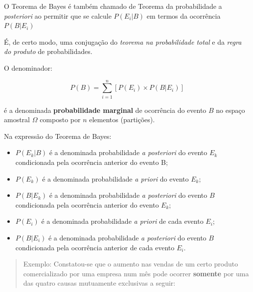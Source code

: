 \documentclass[
]{book}
\providecommand{\tightlist}{%
  \setlength{\itemsep}{0pt}\setlength{\parskip}{0pt}}
\begin{document}
\hfill\break

O Teorema de Bayes é também chamado de Teorema da probabilidade a \emph{posteriori} ao permitir que se calcule \(P(E_{i}|B)\) em termos da ocorrência \(P(B|E_{i})\)

\hfill\break

É, de certo modo, uma conjugação do \emph{teorema na probabilidade total} e da \emph{regra do produto} de probabilidades.

\hfill\break

O denominador:

\hfill\break

\[
P(B)=  \sum _{i=1}^{n}\left[P\left({E}_{i}\right)\times P\left(B|{E}_{i}\right)\right]
\]

\hfill\break

é a denominada \textbf{probabilidade marginal} de ocorrência do evento \(B\) no espaço amostral \(\Omega\) composto por \(n\) elementos (partições).

\hfill\break

Na expressão do Teorema de Bayes:

\hfill\break

\begin{itemize}
\tightlist
\item
  \(P(E_{k}|B)\) é a denominada probabilidade \emph{a posteriori} do evento \(E_{k}\) condicionada pela ocorrência anterior do evento B;\\
\item
  \(P(E_{k})\) é a denominada probabilidade \emph{a priori} do evento \(E_{k}\);\\
\item
  \(P(B|E_{k})\) é a denominada probabilidade \emph{a posteriori} do evento \(B\) condicionada pela ocorrência anterior do evento \(E_{k}\);\\
\item
  \(P(E_{i})\) é a denominada probabilidade \emph{a priori} de cada evento \(E_{i}\);\\
\item
  \(P(B|E_{i})\) é a denominada probabilidade \emph{a posteriori} do evento \(B\) condicionada pela ocorrência anterior de cada evento \(E_{i}\).
\end{itemize}

\hfill\break

\begin{quote}
Exemplo: Constatou-se que o aumento nas vendas de um certo produto comercializado por uma empresa num mês pode ocorrer \textbf{somente} por uma das quatro causas mutuamente exclusivas a seguir:
\end{quote}
\end{document}

